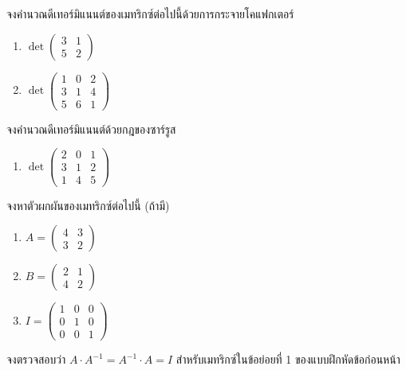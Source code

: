 \begin{exercise}
จงคำนวณดีเทอร์มิแนนต์ของเมทริกซ์ต่อไปนี้ด้วยการกระจายโคแฟกเตอร์
\begin{enumerate}
    \item $\det\begin{pmatrix} 3 & 1 \\ 5 & 2 \end{pmatrix}$
    \item $\det\begin{pmatrix} 1 & 0 & 2 \\ 3 & 1 & 4 \\ 5 & 6 & 1 \end{pmatrix}$
\end{enumerate}
\end{exercise}

\begin{exercise}
จงคำนวณดีเทอร์มิแนนต์ด้วยกฎของซาร์รูส
\begin{enumerate}
    \item $\det\begin{pmatrix} 2 & 0 & 1 \\ 3 & 1 & 2 \\ 1 & 4 & 5 \end{pmatrix}$
\end{enumerate}
\end{exercise}

\begin{exercise}
จงหาตัวผกผันของเมทริกซ์ต่อไปนี้ (ถ้ามี)
\begin{enumerate}
    \item $A = \begin{pmatrix} 4 & 3 \\ 3 & 2 \end{pmatrix}$
    \item $B = \begin{pmatrix} 2 & 1 \\ 4 & 2 \end{pmatrix}$
    \item $I = \begin{pmatrix} 1 & 0 & 0 \\ 0 & 1 & 0 \\ 0 & 0 & 1 \end{pmatrix}$
\end{enumerate}
\end{exercise}

\begin{exercise}
จงตรวจสอบว่า $A \cdot A^{-1} = A^{-1} \cdot A = I$ สำหรับเมทริกซ์ในข้อย่อยที่ 1 ของแบบฝึกหัดข้อก่อนหน้า
\end{exercise}

